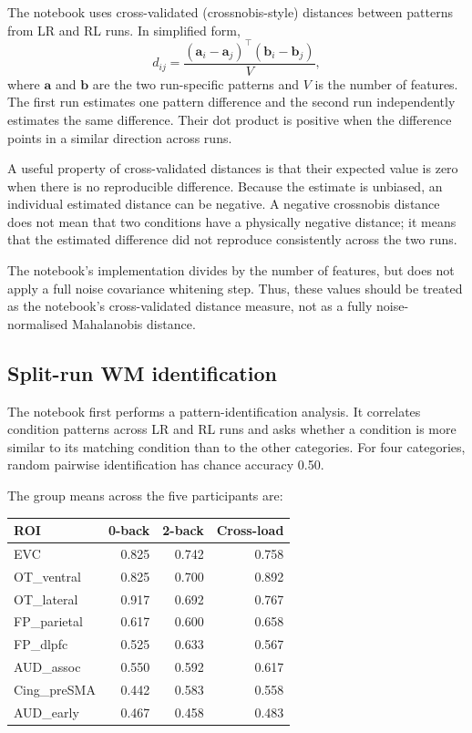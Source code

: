 \documentclass[11pt,a4paper]{article}
\begin{document}
The notebook uses cross-validated (crossnobis-style) distances between patterns from LR and RL runs. In simplified form,
\[
d_{ij} =
\frac{(\mathbf{a}_i-\mathbf{a}_j)^\top
      (\mathbf{b}_i-\mathbf{b}_j)}{V},
\]
where \(\mathbf{a}\) and \(\mathbf{b}\) are the two run-specific patterns and \(V\) is the number of features. The first run estimates one pattern difference and the second run independently estimates the same difference. Their dot product is positive when the difference points in a similar direction across runs.

A useful property of cross-validated distances is that their expected value is zero when there is no reproducible difference. Because the estimate is unbiased, an individual estimated distance can be negative. A negative crossnobis distance does not mean that two conditions have a physically negative distance; it means that the estimated difference did not reproduce consistently across the two runs.

The notebook's implementation divides by the number of features, but does not apply a full noise covariance whitening step. Thus, these values should be treated as the notebook's cross-validated distance measure, not as a fully noise-normalised Mahalanobis distance.

\subsection{Split-run WM identification}

The notebook first performs a pattern-identification analysis. It correlates condition patterns across LR and RL runs and asks whether a condition is more similar to its matching condition than to the other categories. For four categories, random pairwise identification has chance accuracy 0.50.

The group means across the five participants are:

\begin{center}
\begin{tabular}{lrrr}
\toprule
\textbf{ROI} & \textbf{0-back} & \textbf{2-back} & \textbf{Cross-load}\\
\midrule
EVC & 0.825 & 0.742 & 0.758\\
OT\_ventral & 0.825 & 0.700 & 0.892\\
OT\_lateral & 0.917 & 0.692 & 0.767\\
FP\_parietal & 0.617 & 0.600 & 0.658\\
FP\_dlpfc & 0.525 & 0.633 & 0.567\\
AUD\_assoc & 0.550 & 0.592 & 0.617\\
Cing\_preSMA & 0.442 & 0.583 & 0.558\\
AUD\_early & 0.467 & 0.458 & 0.483\\
\bottomrule
\end{tabular}
\end{center}
\end{document}

